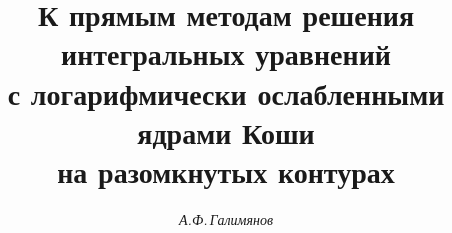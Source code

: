 






\newcommand{\const}{\operatorname{const}}


\newcommand{\ctg}{\operatorname{ctg}}


\newcommand{\tts}[1]{} 







\setcounter{page}{73}















\author{\it А.Ф.\,Галимянов}




\title{К прямым методам решения интегральных уравнений \\


с логарифмически ослабленными ядрами Коши \\


на разомкнутых контурах}





\date{}




\pagestyle{plain} %







\maketitle


